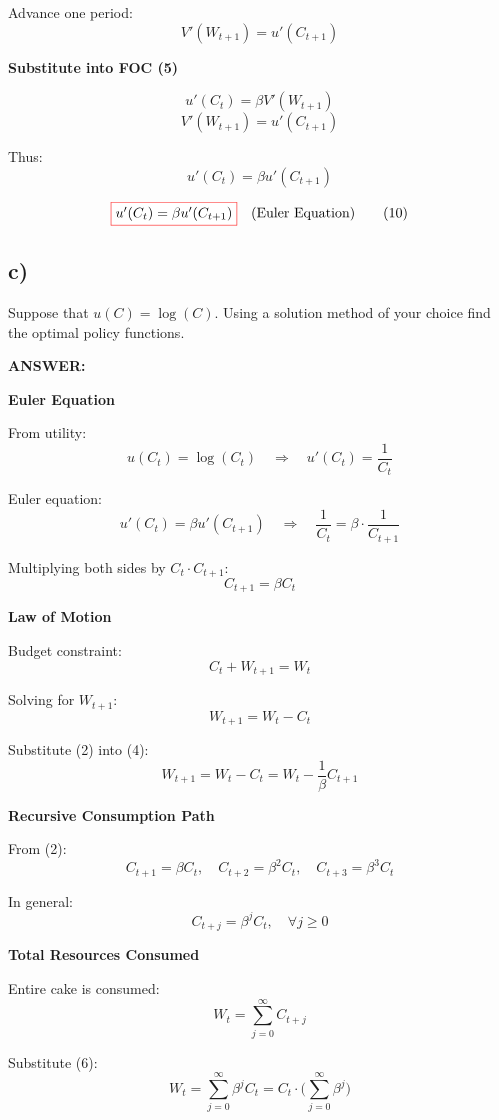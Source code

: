 \documentclass[12pt]{article}
\begin{document}
Advance one period:
\[
V'(W_{t+1}) = u'(C_{t+1}) \tag{8}
\]

\textbf{Substitute into FOC (5)}

\[
u'(C_t) = \beta V'(W_{t+1}) \tag{5 repeated}
\]
\[
V'(W_{t+1}) = u'(C_{t+1}) \tag{8 repeated}
\]

Thus:
\[
u'(C_t) = \beta u'(C_{t+1}) \tag{9}
\]

\[
\fcolorbox{red}{white}{$
u'(C_t) = \beta u'(C_{t+1})
$} \quad \text{(Euler Equation)} \tag{10}
\]

\subsection*{\textbf{c)}}

Suppose that \( u(C) = \log(C) \). Using a solution method of your choice find the optimal policy functions.

\vspace{0.5em}
\noindent\textcolor{formalred}{\textbf{ANSWER:}}

\textbf{Euler Equation}  

From utility:  
\[
u(C_t) = \log(C_t) 
\quad \Rightarrow \quad 
u'(C_t) = \frac{1}{C_t}
\]

Euler equation:  
\[
u'(C_t) = \beta u'(C_{t+1}) 
\quad \Rightarrow \quad 
\frac{1}{C_t} = \beta \cdot \frac{1}{C_{t+1}} 
\tag{1}
\]

Multiplying both sides by \( C_t \cdot C_{t+1} \):  
\[
C_{t+1} = \beta C_t \tag{2}
\]

\textbf{Law of Motion}  

Budget constraint:  
\[
C_t + W_{t+1} = W_t \tag{3}
\]

Solving for \( W_{t+1} \):  
\[
W_{t+1} = W_t - C_t \tag{4}
\]

Substitute (2) into (4):  
\[
W_{t+1} = W_t - C_t 
= W_t - \frac{1}{\beta} C_{t+1} \tag{5}
\]

\textbf{Recursive Consumption Path}  

From (2):  
\[
C_{t+1} = \beta C_t, 
\quad C_{t+2} = \beta^2 C_t, 
\quad C_{t+3} = \beta^3 C_t
\]

In general:  
\[
C_{t+j} = \beta^j C_t, 
\quad \forall j \geq 0 
\tag{6}
\]


\textbf{Total Resources Consumed}  

Entire cake is consumed:  
\[
W_t = \sum_{j=0}^\infty C_{t+j} \tag{7}
\]

Substitute (6):  
\[
W_t = \sum_{j=0}^\infty \beta^j C_t 
= C_t \cdot \Big( \sum_{j=0}^\infty \beta^j \Big) 
\tag{8}
\]
\end{document}

